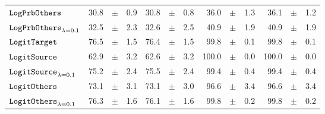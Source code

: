 \documentclass[../main.tex]{subfiles}
\begin{document}
\begin{tabular}{lrrrrrrrrrrrr}
$\mathtt{LogPrbOthers}_{}$              & 30.8                            & $\pm$                                        & 0.9                        & 30.8                                                                                   & $\pm$ & 0.8                                & 36.0  & $\pm$ & 1.3             & 36.1  & $\pm$ & 1.2                           \\
$\mathtt{LogPrbOthers}_{\lambda=0.1}$   & 32.5                            & $\pm$                                        & 2.3                        & 32.6                                                                                   & $\pm$ & 2.5                                & 40.9  & $\pm$ & 1.9             & 40.9  & $\pm$ & 1.9                           \\
$\mathtt{LogitTarget}$                 & 76.5                            & $\pm$                                        & 1.5                        & 76.4                                                                                     & $\pm$ & 1.5                                & 99.8  & $\pm$ & 0.1             & 99.8  & $\pm$ & 0.1                           \\
$\mathtt{LogitSource}_{}$               & 62.9                            & $\pm$                                        & 3.2                        & 62.6                                                                                   & $\pm$ & 3.2                                & 100.0 & $\pm$ & 0.0             & 100.0 & $\pm$ & 0.0                           \\
$\mathtt{LogitSource}_{\lambda=0.1}$    & 75.2                            & $\pm$                                        & 2.4                        & 75.5                                                                                   & $\pm$ & 2.4                                & 99.4  & $\pm$ & 0.4             & 99.4  & $\pm$ & 0.4                           \\
$\mathtt{LogitOthers}_{}$               & 73.1                            & $\pm$                                        & 3.1                        & 73.1                                                                                 & $\pm$ & 3.0                                & 96.6  & $\pm$ & 3.4             & 96.6  & $\pm$ & 3.4                           \\
$\mathtt{LogitOthers}_{\lambda=0.1}$    & 76.3                            & $\pm$                                        & 1.6                        & 76.1                                                                                   & $\pm$ & 1.6                                & 99.8  & $\pm$ & 0.2             & 99.8  & $\pm$ & 0.2                           \\

\end{tabular}
\end{document}
